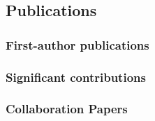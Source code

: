 \documentclass[12pt,letterpaper]{article}
\begin{document}
\ifdefined\withpubs
  \subsection{Publications}
  

  \subsubsection{First-author publications}
\begin{list}{}{\cvlist}
  
\end{list}

\subsubsection{Significant contributions}
\begin{list}{}{\cvlist}
  
\end{list}

\subsubsection{Collaboration Papers}
\begin{list}{}{\cvlist}
  
\end{list}
\fi
\end{document}
